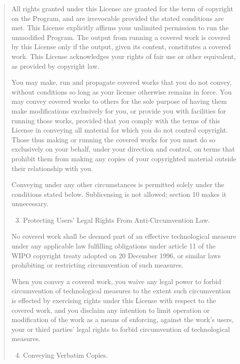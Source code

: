 \documentclass[letterpaper,10pt,english]{sphinxmanual}
\begin{document}
\begin{quote}
All rights granted under this License are granted for the term of
copyright on the Program, and are irrevocable provided the stated
conditions are met.  This License explicitly affirms your unlimited
permission to run the unmodified Program.  The output from running a
covered work is covered by this License only if the output, given its
content, constitutes a covered work.  This License acknowledges your
rights of fair use or other equivalent, as provided by copyright law.

You may make, run and propagate covered works that you do not
convey, without conditions so long as your license otherwise remains
in force.  You may convey covered works to others for the sole purpose
of having them make modifications exclusively for you, or provide you
with facilities for running those works, provided that you comply with
the terms of this License in conveying all material for which you do
not control copyright.  Those thus making or running the covered works
for you must do so exclusively on your behalf, under your direction
and control, on terms that prohibit them from making any copies of
your copyrighted material outside their relationship with you.

Conveying under any other circumstances is permitted solely under
the conditions stated below.  Sublicensing is not allowed; section 10
makes it unnecessary.
\begin{enumerate}
\setcounter{enumi}{2}
\item {} 
Protecting Users' Legal Rights From Anti-Circumvention Law.

\end{enumerate}

No covered work shall be deemed part of an effective technological
measure under any applicable law fulfilling obligations under article
11 of the WIPO copyright treaty adopted on 20 December 1996, or
similar laws prohibiting or restricting circumvention of such
measures.

When you convey a covered work, you waive any legal power to forbid
circumvention of technological measures to the extent such circumvention
is effected by exercising rights under this License with respect to
the covered work, and you disclaim any intention to limit operation or
modification of the work as a means of enforcing, against the work's
users, your or third parties' legal rights to forbid circumvention of
technological measures.
\begin{enumerate}
\setcounter{enumi}{3}
\item {} 
Conveying Verbatim Copies.


\end{enumerate}
\end{quote}
\end{document}

